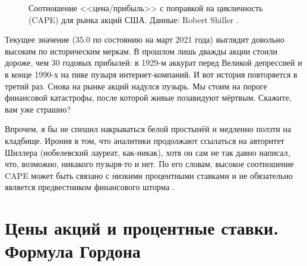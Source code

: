 \begin{figure}[bt]
\centering
{}
\caption{Соотношение <<цена/прибыль>> с поправкой на цикличность (CAPE) для 
рынка акций США. Данные: Robert Shiller \cite{shillerOnline}.}
\label{shiller_pe_historical_chart}
\end{figure}

Текущее значение (35.0 по состоянию на март 2021 года) выглядит довольно 
высоким по историческим меркам. В прошлом лишь дважды акции стоили дороже, чем 
30 годовых прибылей: в 1929-м аккурат перед Великой депрессией и в конце 1990-х 
на пике пузыря интернет-компаний. И вот история повторяется в третий раз. Снова 
на рынке акций надулся пузырь. Мы стоим на пороге финансовой катастрофы, после 
которой живые позавидуют мёртвым. Скажите, вам уже страшно?

Впрочем, я бы не спешил накрываться белой простынёй и медленно ползти на 
кладбище. Ирония в том, что аналитики продолжают ссылаться на авторитет Шиллера 
(нобелевский лауреат, как-никак), хотя он сам не так давно написал, что, 
возможно, никакого пузыря-то и нет. По его словам, высокое соотношение CAPE 
может быть связано с низкими процентными ставками и не обязательно является 
предвестником финансового шторма \cite{shiller2020cape}.

\section*{Цены акций и процентные ставки. Формула Гордона}

